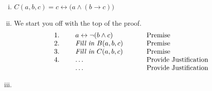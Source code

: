 \documentclass[12pt]{article}
\begin{document}
\begin{enumerate}[(a)]
\begin{enumerate}[(i)]
				\item $C(a,b,c) = c \leftrightarrow \bigl(a \wedge (b \rightarrow c)\bigr
					)$

				\item We start you off with the top of the proof.
					\[
						\begin{array}{lclcl}
							1. & \  & a \leftrightarrow \neg(b \wedge c) & \hspace*{.2in} & \mbox{Premise}               \\
							2. & \  & \mbox{\em Fill in $B(a,b,c)$}      & \hspace*{.2in} & \mbox{Premise}               \\
							3. & \  & \mbox{\em Fill in $C(a,b,c)$}      & \hspace*{.2in} & \mbox{Premise}               \\
							4. & \  & \ldots                             & \hspace*{.2in} & \mbox{Provide Justification} \\
							   & \  & \ldots                             & \hspace*{.2in} & \mbox{Provide Justification} \\
						\end{array}
					\]

				\item
			\end{enumerate}
	\end{enumerate}
\end{document}
